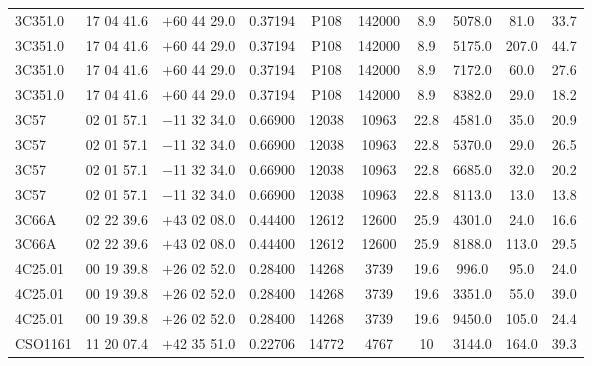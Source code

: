 \begin{landscape}
\begin{center}
\begin{longtable}{l c c c c c c c c c}
3C351.0  &                 17 04 41.6  &         $+$60 44 29.0  &       0.37194  & P108  &    142000  &     8.9  &       5078.0  &  81.0  &   33.7  \\
3C351.0  &                 17 04 41.6  &         $+$60 44 29.0  &       0.37194  & P108  &    142000  &     8.9  &       5175.0  &  207.0  &  44.7  \\
3C351.0  &                 17 04 41.6  &         $+$60 44 29.0  &       0.37194  & P108  &    142000  &     8.9  &       7172.0  &  60.0  &   27.6  \\
3C351.0  &                 17 04 41.6  &         $+$60 44 29.0  &       0.37194  & P108  &    142000  &     8.9  &       8382.0  &  29.0  &   18.2  \\
3C57  &                    02 01 57.1  &         $-$11 32 34.0  &       0.66900  & 12038  &   10963  &      22.8  &      4581.0  &  35.0  &   20.9  \\
3C57  &                    02 01 57.1  &         $-$11 32 34.0  &       0.66900  & 12038  &   10963  &      22.8  &      5370.0  &  29.0  &   26.5  \\
3C57  &                    02 01 57.1  &         $-$11 32 34.0  &       0.66900  & 12038  &   10963  &      22.8  &      6685.0  &  32.0  &   20.2  \\
3C57  &                    02 01 57.1  &         $-$11 32 34.0  &       0.66900  & 12038  &   10963  &      22.8  &      8113.0  &  13.0  &   13.8  \\
3C66A  &                   02 22 39.6  &         $+$43 02 08.0  &       0.44400  & 12612  &   12600  &      25.9  &      4301.0  &  24.0  &   16.6  \\
3C66A  &                   02 22 39.6  &         $+$43 02 08.0  &       0.44400  & 12612  &   12600  &      25.9  &      8188.0  &  113.0  &  29.5  \\
4C25.01  &                 00 19 39.8  &         $+$26 02 52.0  &       0.28400  & 14268  &   3739  &       19.6  &      996.0  &   95.0  &   24.0  \\
4C25.01  &                 00 19 39.8  &         $+$26 02 52.0  &       0.28400  & 14268  &   3739  &       19.6  &      3351.0  &  55.0  &   39.0  \\
4C25.01  &                 00 19 39.8  &         $+$26 02 52.0  &       0.28400  & 14268  &   3739  &       19.6  &      9450.0  &  105.0  &  24.4  \\
CSO1161  &                 11 20 07.4  &         $+$42 35 51.0  &       0.22706  & 14772  &   4767  &       10  &        3144.0  &  164.0  &  39.3  \\

\end{longtable}
\end{center}
\end{landscape}
